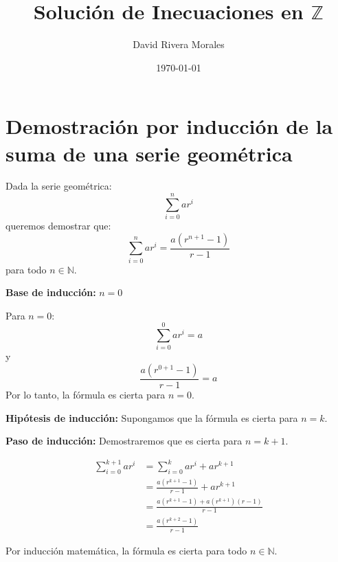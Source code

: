 \documentclass{article}
\begin{document}
\title{Solución de Inecuaciones en \( \mathbb{Z} \)}
\author{David Rivera Morales}
\date{\today}

\maketitle


\section*{Demostración por inducción de la suma de una serie geométrica}

Dada la serie geométrica:
\[
\sum_{i=0}^{n} ar^i
\]
queremos demostrar que:
\[
\sum_{i=0}^{n} ar^i = \frac{a(r^{n+1}-1)}{r-1}
\]
para todo \( n \in \mathbb{N} \).

\textbf{Base de inducción:} \( n = 0 \)

Para \( n = 0 \):
\[
\sum_{i=0}^{0} ar^i = a
\]
y
\[
\frac{a(r^{0+1}-1)}{r-1} = a
\]
Por lo tanto, la fórmula es cierta para \( n = 0 \).

\textbf{Hipótesis de inducción:} Supongamos que la fórmula es cierta para \( n = k \).

\textbf{Paso de inducción:} Demostraremos que es cierta para \( n = k+1 \).

\begin{align*}
\sum_{i=0}^{k+1} ar^i &= \sum_{i=0}^{k} ar^i + ar^{k+1} \\
&= \frac{a(r^{k+1}-1)}{r-1} + ar^{k+1} \\
&= \frac{a(r^{k+1}-1) + a(r^{k+1})(r-1)}{r-1} \\
&= \frac{a(r^{k+2}-1)}{r-1}
\end{align*}

Por inducción matemática, la fórmula es cierta para todo \( n \in \mathbb{N} \).
\end{document}
